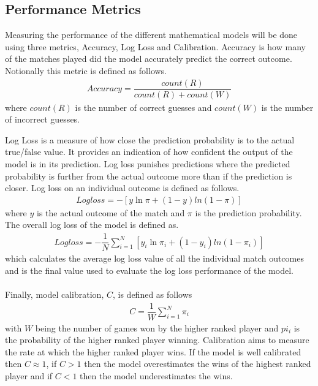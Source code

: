 \documentclass[12pt,a4paper]{article}
\begin{document}
\subsection{Performance Metrics}
Measuring the performance of the different mathematical models will be done using
three metrics, Accuracy, Log Loss and Calibration. Accuracy is how many of the matches played
did the model accurately predict the correct outcome. Notionally this metric is
defined as follows.
\begin{gather}
  Accuracy = \dfrac{count(R)}{count(R)+count(W)}
\end{gather}
where $count(R)$ is the number of correct guesses and $count(W)$ is the number
of incorrect guesses.

Log Loss is a measure of how close the prediction probability is to the actual
true/false value. It provides an indication of how confident the output of the
model is in its prediction. Log loss punishes predictions where the predicted
probability is further from the actual outcome more than if the prediction is
closer. Log loss on an individual outcome is defined as follows.
\begin{gather}
  Logloss = -[y \ln \pi +(1-y)ln(1-\pi)]
\end{gather}
where $y$ is the actual outcome of the match and $\pi$ is the prediction probability.
The overall log loss of the model is defined as.
\begin{gather}
  Logloss = -\dfrac{1}{N}\sum_{i=1}^{N}[y_i \ln \pi_i +(1-y_i)ln(1-\pi_i)]
\end{gather}
which calculates the average log loss value of all the individual match outcomes
and is the final value used to evaluate the log loss performance of the model.
\\
\\
Finally, model calibration, $C$, is defined as follows
\begin{gather}
  C = \dfrac{1}{W}\sum_{i=1}^{N}\pi_i
\end{gather}
with $W$ being the number of games won by the higher ranked player and $pi_i$ is the
probability of the higher ranked player winning. Calibration aims to measure the rate
at which the higher ranked player wins. If the model is well calibrated then $C \approx 1$,
if $C > 1$ then the model overestimates the wins of the highest ranked player and if
$C < 1$ then the model underestimates the wins.

\clearpage
\end{document}

